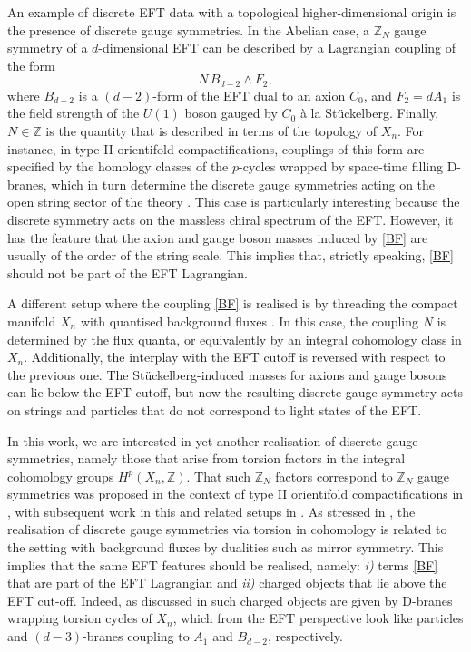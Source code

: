 \documentclass[11pt]{article}
\def\be{\begin{equation}}
\def\ee{\end{equation}}
\newcommand{\IZ}{\mathbb{Z}}
\begin{document}
An example of discrete EFT data with a topological higher-dimensional origin is the presence of discrete gauge symmetries. In the Abelian case, a $\IZ_N$ gauge symmetry of a $d$-dimensional EFT can be described by a Lagrangian coupling of the form \cite{Banks:2010zn}
\be
N  \, B_{d-2} \wedge F_2 ,
\label{BF}
\ee
where $B_{d-2}$ is a $(d-2)$-form of the EFT  dual to an axion $C_0$, and $F_2=dA_1$ is the field strength of the $U(1)$ boson gauged by $C_0$  \`a la St\"uckelberg. Finally, $N \in \IZ$ is the quantity that is described in terms of the topology of $X_n$. For instance, in type II orientifold compactifications, couplings of this form are specified by the homology classes of the $p$-cycles wrapped by space-time filling D-branes, which in turn determine the discrete gauge symmetries acting on the open string sector of the theory \cite{Berasaluce-Gonzalez:2011gos}. This case is particularly interesting because the discrete symmetry acts on the massless chiral spectrum of the EFT. However, it has the feature that the axion and gauge boson masses induced by \eqref{BF} are usually of the order of the string scale. This implies that, strictly speaking, \eqref{BF} should not be part of the EFT Lagrangian. 

A different setup where the coupling \eqref{BF} is realised is by threading the compact manifold $X_n$ with quantised background fluxes \cite{Berasaluce-Gonzalez:2012awn}. In this case, the coupling $N$ is determined by the flux quanta, or equivalently by an integral cohomology class in $X_n$. Additionally, the interplay with the EFT cutoff is reversed with respect to the previous one. The St\"uckelberg-induced masses for axions and gauge bosons can lie below the EFT cutoff, but now the resulting discrete gauge symmetry acts on strings and particles that do not correspond to light states of the EFT. 

In this work, we are interested in yet another realisation of discrete gauge symmetries, namely those that arise from torsion factors in the integral cohomology groups $H^p(X_n, \IZ)$. That such $\IZ_N$ factors correspond to $\IZ_N$  gauge symmetries was proposed in the context of type II orientifold compactifications in  \cite{Camara:2011jg}, with subsequent work in this and related setups in \cite{Grimm:2011tb,Berasaluce-Gonzalez:2012abm,Berasaluce-Gonzalez:2012awn,Mayrhofer:2014laa,Grimm:2015ona,Braun:2017oak}. As stressed in \cite{Berasaluce-Gonzalez:2012awn}, the realisation of discrete gauge symmetries via torsion in cohomology is related to the setting with background fluxes by dualities such as mirror symmetry. This implies that the same EFT features should be realised, namely: {\it i)} terms \eqref{BF} that are part of the EFT Lagrangian and {\it ii)}  charged objects that lie above the EFT cut-off. Indeed, as discussed in \cite{Camara:2011jg} such charged objects are given by D-branes wrapping torsion cycles of $X_n$, which from the EFT perspective look like particles and $(d-3)$-branes coupling to $A_1$ and $B_{d-2}$, respectively. 
\end{document}
